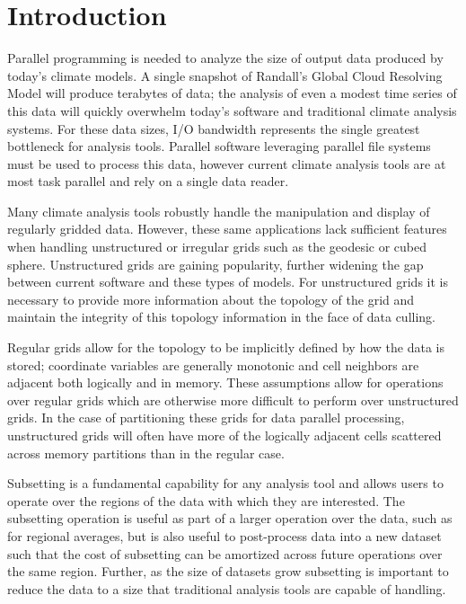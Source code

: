 \section{Introduction}
\label{section:introduction}

Parallel programming is needed to analyze the size of output data produced by
today's climate models.\cite{MODSIM07:LOT}  A single snapshot of Randall's
Global Cloud Resolving Model will produce terabytes of data\cite{GCRM}; the
analysis of even a modest time series of this data will quickly overwhelm
today's software and traditional climate analysis systems.  For these data
sizes, I/O bandwidth represents the single greatest bottleneck for analysis
tools.  Parallel software leveraging parallel file systems must be used to
process this data, however current climate analysis tools are at most task
parallel and rely on a single data reader.\cite{CDAT}\cite{CDO}\cite{NCO}

Many climate analysis tools robustly handle the manipulation and display of
regularly gridded data.  However, these same applications lack sufficient
features when handling unstructured or irregular grids such as the geodesic or
cubed sphere\cite{CUBE}.  Unstructured grids are gaining popularity, further
widening the gap between current software and these types of models.  For
unstructured grids it is necessary to provide more information about the
topology of the grid and maintain the integrity of this topology information
in the face of data culling.

Regular grids allow for the topology to be implicitly defined by how
the data is stored; coordinate variables are generally monotonic and cell
neighbors are adjacent both logically and in memory. These assumptions allow
for operations over regular grids which are otherwise more difficult to
perform over unstructured grids. In the case of partitioning these grids for
data parallel processing, unstructured grids will often have more of the
logically adjacent cells scattered across memory partitions than in the
regular case.

Subsetting is a fundamental capability for any analysis tool and allows users
to operate over the regions of the data with which they are interested. The
subsetting operation is useful as part of a larger operation over the data,
such as for regional averages, but is also useful to post-process data into a
new dataset such that the cost of subsetting can be amortized across future
operations over the same region. Further, as the size of datasets grow
subsetting is important to reduce the data to a size that traditional analysis
tools are capable of handling. 

